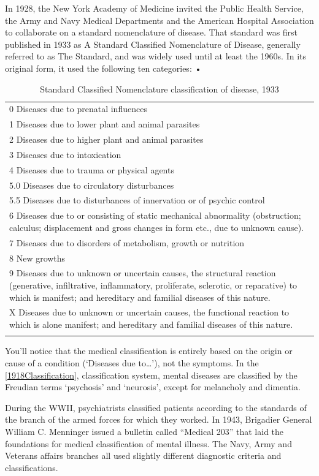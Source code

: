 In 1928, the New York Academy of Medicine invited the Public Health Service, the Army and Navy Medical Departments and the American Hospital Association to collaborate on a standard nomenclature of disease. That standard was first published in 1933 as A Standard Classified Nomenclature of Disease, generally referred to as The Standard, and was widely used until at least the 1960s. In its original form, it used the following ten categories:
 •  \begin{longtable}[!t]{ | p{13.8cm}  | }
\hline
0 Diseases due to prenatal influences\\
1 Diseases due to lower plant and animal parasites\\
2 Diseases due to higher plant and animal parasites\\
3 Diseases due to intoxication\\
4 Diseases due to trauma or physical agents\\
5.0 Diseases due to circulatory disturbances\\
5.5 Diseases due to disturbances of innervation or of psychic control\\
6 Diseases due to or consisting of static mechanical abnormality (obstruction; calculus; displacement and gross changes in form etc., due to unknown cause).\\
7 Diseases due to disorders of metabolism, growth or nutrition\\
8 New growths\\
9 Diseases due to unknown or uncertain causes, the structural reaction (generative, infiltrative, inflammatory, proliferate, sclerotic, or reparative) to which is manifest; and hereditary and familial diseases of this nature.\\
X Diseases due to unknown or uncertain causes, the functional reaction to which is alone manifest; and hereditary and familial diseases of this nature.\\ \hline
\caption{Standard Classified Nomenclature classification of disease, 1933}
\label{table: 1933Classification}
\end{longtable}


You'll notice that the medical classification is entirely based on the origin or cause of a condition (`Diseases due to{\ldots}'), not the symptoms. In the \ref{1918Classification}, classification system, mental diseases are classified by the Freudian terms `psychosis' and `neurosis', except for melancholy and dimentia.

During the WWII, psychiatrists classified patients according to the standards of the branch of the armed forces for which they worked. In 1943, Brigadier General William C. Menninger issued a bulletin called “Medical 203” that laid the foundations for medical classification of mental illness. The Navy, Army and Veterans affairs branches all used slightly different diagnostic criteria and classifications.


